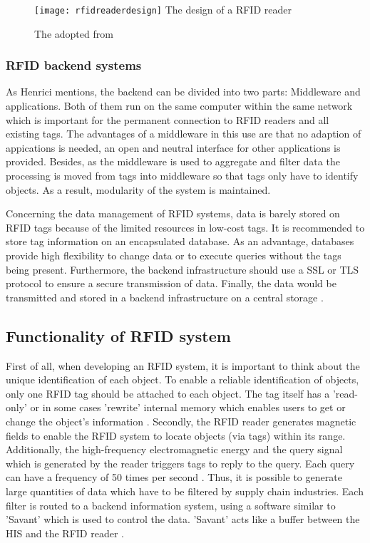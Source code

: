 \begin{figure}
\centering
\texttt{[image: rfidreaderdesign]} The design of a RFID reader 
\caption{\label{fig:readerdesign}The adopted from \cite[p.17]{chipless}} 
\end{figure}

\subsubsection{RFID backend systems} \label{backend}

As Henrici \cite{henrici} mentions, the backend can be divided into two parts: Middleware and applications. Both of them run on the same computer within the same network which is important for the permanent connection to RFID readers and all existing tags. The advantages of a middleware in this use are that no adaption of appications is needed, an open and neutral interface for other applications is provided. Besides, as the middleware is used to aggregate and filter data the processing is moved from tags into middleware so that tags only have to identify objects. As a result, modularity of the system is maintained.

Concerning the data management of RFID systems, data is barely stored on RFID tags because of the limited resources in low-cost tags. It is recommended \cite{henrici} to store tag information on an encapsulated database. As an advantage, databases provide high flexibility to change data or to execute queries without the tags being present. Furthermore, the backend infrastructure should use a \ac{SSL} or \ac{TLS} protocol to ensure a secure transmission of data. Finally, the data would be transmitted and stored in a backend infrastructure on a central storage \cite{henrici}.

\subsection{Functionality of RFID system}

First of all, when developing an RFID system, it is important to think about the unique identification of each object. To enable a reliable identification of objects, only one RFID tag should be attached to each object. The tag itself has a 'read-only' or in some cases 'rewrite' internal memory which enables users to get or change the object's information \cite{ncbi}. 
Secondly, the RFID reader generates magnetic fields to enable the RFID system to locate objects (via tags) within its range. Additionally, the high-frequency electromagnetic energy and the query signal which is generated by the reader triggers tags to reply to the query. Each query can have a frequency of 50 times per second \cite{ncbi}. Thus, it is possible to generate large quantities of data which have to be filtered by supply chain industries. Each filter is routed to a backend information system, using a software similar to 'Savant' which is used to control the data. 'Savant' acts like a buffer between the \ac{HIS} and the RFID reader \cite{ncbi}.

